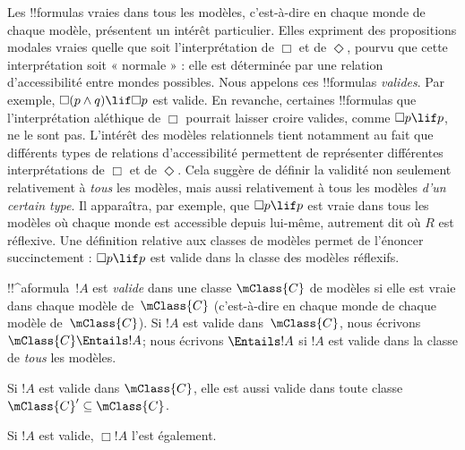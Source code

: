 \documentclass[../../../include/open-logic-section]{subfiles}
\begin{document}


\begin{explain}
  Les !!{formula}s vraies dans tous les modèles, c'est-à-dire en
  chaque monde de chaque modèle, présentent un intérêt particulier.
  Elles expriment des propositions modales vraies quelle que soit
  l'interprétation de $\Box$ et de $\Diamond$, pourvu que cette
  interprétation soit « normale » : elle est déterminée par une
  relation d'accessibilité entre mondes possibles. Nous appelons
  ces !!{formula}s \emph{valides}. Par exemple,
  $\Box(p \land q) \lif \Box p$ est valide. En revanche, certaines
  !!{formula}s que l'interprétation aléthique de $\Box$ pourrait
  laisser croire valides, comme $\Box p \lif p$, ne le sont pas.
  L'intérêt des modèles relationnels tient notamment au fait que
  différents types de relations d'accessibilité permettent de
  représenter différentes interprétations de $\Box$ et de
  $\Diamond$. Cela suggère de définir la validité non seulement
  relativement à \emph{tous} les modèles, mais aussi relativement
  à tous les modèles \emph{d'un certain type}. Il apparaîtra, par
  exemple, que $\Box p \lif p$ est vraie dans tous les modèles où
  chaque monde est accessible depuis lui-même, autrement dit où
  $R$ est réflexive. Une définition relative aux classes de
  modèles permet de l'énoncer succinctement :
  $\Box p \lif p$ est valide dans la classe des modèles réflexifs.
\end{explain}

\begin{defn}
  !!^a{formula}~$!A$ est \emph{valide} dans une classe
  $\mClass{C}$ de modèles si elle est vraie dans chaque modèle
  de~$\mClass{C}$ (c'est-à-dire en chaque monde de chaque modèle
  de~$\mClass{C}$). Si $!A$ est valide dans~$\mClass{C}$, nous
  écrivons $\mClass{C} \Entails !A$; nous écrivons $\Entails !A$
  si $!A$ est valide dans la classe de \emph{tous} les modèles.
\end{defn}

\begin{prop}
  Si $!A$ est valide dans $\mClass{C}$, elle est aussi valide dans
  toute classe $\mClass{C}' \subseteq \mClass{C}$.
\end{prop}

\begin{prop}
  Si $!A$ est valide, $\Box!A$ l'est également.
\end{prop}
\end{document}
